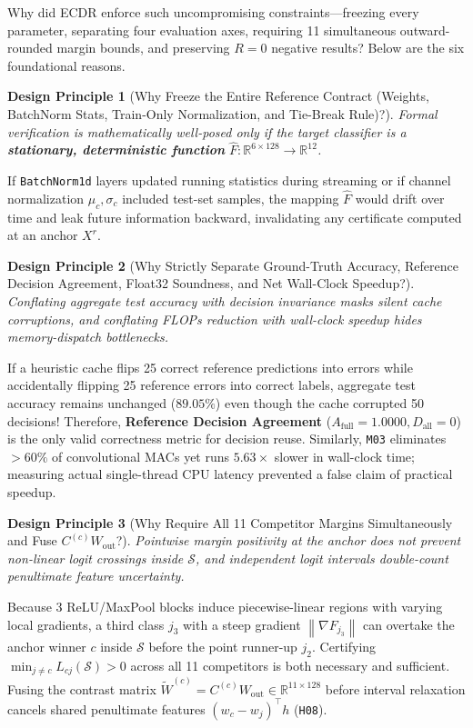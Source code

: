 \documentclass[11pt,a4paper]{article}
\newcommand{\R}{\mathbb{R}}
\newcommand{\norm}[1]{\left\lVert #1\right\rVert}
\newcommand{\code}[1]{{\small\ttfamily\nolinkurl{#1}}}
\newcommand{\Sset}{\mathcal{S}}
\newtheorem{principle}{Design Principle}[section]
\begin{document}
Why did ECDR enforce such uncompromising constraints---freezing every parameter, separating four evaluation axes, requiring 11 simultaneous outward-rounded margin bounds, and preserving $R=0$ negative results? Below are the six foundational reasons.

\begin{principle}[Why Freeze the Entire Reference Contract (Weights, BatchNorm Stats, Train-Only Normalization, and Tie-Break Rule)?]
Formal verification is mathematically well-posed only if the target classifier is a \textbf{stationary, deterministic function} $\widehat{F}: \R^{6 \times 128} \to \R^{12}$.
\end{principle}
If \code{BatchNorm1d} layers updated running statistics during streaming or if channel normalization $\mu_c, \sigma_c$ included test-set samples, the mapping $\widehat{F}$ would drift over time and leak future information backward, invalidating any certificate computed at an anchor $X^r$.

\begin{principle}[Why Strictly Separate Ground-Truth Accuracy, Reference Decision Agreement, Float32 Soundness, and Net Wall-Clock Speedup?]
Conflating aggregate test accuracy with decision invariance masks silent cache corruptions, and conflating FLOPs reduction with wall-clock speedup hides memory-dispatch bottlenecks.
\end{principle}
If a heuristic cache flips 25 correct reference predictions into errors while accidentally flipping 25 reference errors into correct labels, aggregate test accuracy remains unchanged ($89.05\%$) even though the cache corrupted 50 decisions! Therefore, \textbf{Reference Decision Agreement} ($A_{\text{full}} = 1.0000, D_{\text{all}} = 0$) is the only valid correctness metric for decision reuse. Similarly, \code{M03} eliminates $>60\%$ of convolutional MACs yet runs $5.63\times$ slower in wall-clock time; measuring actual single-thread CPU latency prevented a false claim of practical speedup.

\begin{principle}[Why Require All 11 Competitor Margins Simultaneously and Fuse $C^{(c)} W_{\text{out}}$?]
Pointwise margin positivity at the anchor does not prevent non-linear logit crossings inside $\Sset$, and independent logit intervals double-count penultimate feature uncertainty.
\end{principle}
Because 3 ReLU/MaxPool blocks induce piecewise-linear regions with varying local gradients, a third class $j_3$ with a steep gradient $\norm{\nabla F_{j_3}}$ can overtake the anchor winner $c$ inside $\Sset$ before the point runner-up $j_2$. Certifying $\min_{j \neq c} L_{cj}(\Sset) > 0$ across all 11 competitors is both necessary and sufficient. Fusing the contrast matrix $\widetilde{W}^{(c)} = C^{(c)} W_{\text{out}} \in \R^{11 \times 128}$ before interval relaxation cancels shared penultimate features $(w_c - w_j)^\top h$ (\code{H08}).
\end{document}

